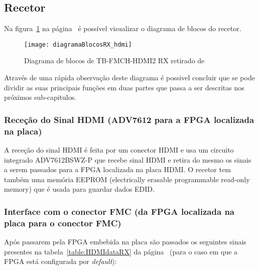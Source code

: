 \subsection{Recetor} \label{subsec:RX}

Na figura~\ref{fig:HDMIblocosRX} na página~\pageref{fig:HDMIblocosRX} é possível visualizar o diagrama de blocos do recetor.

\begin{figure}[h!]
	\begin{center}
		\leavevmode
		\texttt{[image: diagramaBlocosRX\_hdmi]}
		\caption{Diagrama de blocos de TB-FMCH-HDMI2 RX retirado de \cite{R009}}
		\label{fig:HDMIblocosRX}
	\end{center}
\end{figure}
Através  de uma rápida observação deste diagrama é possivel concluir que se pode dividir as suas principais funções em duas partes que passa a ser descritas nos próximos sub-capitulos. 

\subsubsection{Receção do Sinal HDMI (ADV7612 para a FPGA localizada na placa)}
	
A receção do sinal HDMI é feita por um conector HDMI e usa um circuito integrado ADV7612BSWZ-P que recebe sinal HDMI e retira do mesmo os sinais a serem passados para a FPGA localizada na placa HDMI. O recetor tem também uma memória EEPROM (electrically erasable programmable read-only memory) que é usada para guardar dados EDID.
	
\subsubsection{Interface com o conector FMC (da FPGA localizada na placa para o conector FMC)}

Após passarem pela FPGA embebida na placa são passados os seguintes sinais presentes na tabela~\ref{table:HDMIdataRX} da página~\pageref{table:HDMIdataRX} (para o caso em que a FPGA está configurada por \textit{default}):

